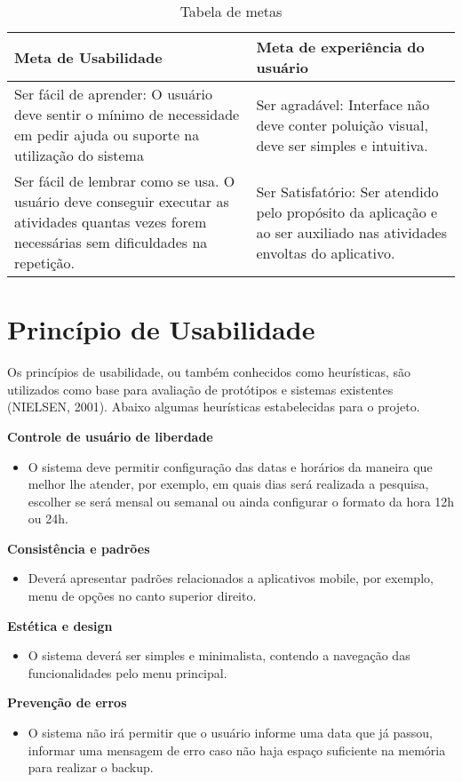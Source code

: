 \begin{table}[H]
	\centering
	\begin{tabular}{p{5cm}|p{5cm}}
		\toprule
			Meta de Usabilidade & Meta de experiência do usuário\\ \hline
		\midrule
			Ser fácil de aprender: O usuário deve sentir o mínimo de necessidade em pedir ajuda ou suporte na utilização do sistema & Ser agradável: Interface não deve conter poluição visual, deve ser simples e intuitiva. \\ \hline
			Ser fácil de lembrar como se usa. O usuário deve conseguir executar as atividades quantas vezes forem necessárias sem dificuldades na repetição. & Ser Satisfatório: Ser atendido pelo propósito da aplicação e ao ser auxiliado nas atividades envoltas do aplicativo. 
	\end{tabular}
	\caption{Tabela de metas}
	\label{tab01}
\end{table}

\section{Princípio de Usabilidade}
Os princípios de usabilidade, ou também conhecidos como heurísticas, são utilizados como base para avaliação de protótipos e sistemas existentes (NIELSEN, 2001).
Abaixo algumas heurísticas estabelecidas para o projeto.

\textbf{Controle de usuário de liberdade}
\begin{itemize}
	\item O sistema deve permitir configuração das datas e horários da maneira que melhor lhe atender, por exemplo, em quais dias será realizada a pesquisa, escolher se será mensal ou semanal ou ainda configurar o formato da hora 12h ou 24h.
\end{itemize}

\textbf{Consistência e padrões}
\begin{itemize}
	\item Deverá apresentar padrões relacionados a aplicativos mobile, por exemplo, menu de opções no canto superior direito.
\end{itemize}

\textbf{Estética e design}
\begin{itemize}
	\item O sistema deverá ser simples e minimalista, contendo a navegação das funcionalidades pelo menu principal.
\end{itemize}

\textbf{Prevenção de erros}
\begin{itemize}
	\item O sistema não irá permitir que o usuário informe uma data que já passou, informar uma mensagem de erro caso não haja espaço suficiente na memória para realizar o backup.
\end{itemize}